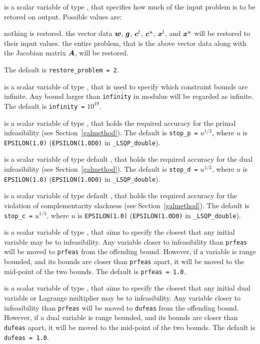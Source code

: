 \documentclass{galahad}
\newcommand{\packagename}{LSQP}
\newcommand{\fullpackagename}{\libraryname\_\-\packagename}
\begin{document}
\begin{description}
 is a scalar variable of type \integer, that 
specifies how much of the input problem is to be retored on output. 
Possible values are:
\begin{description}
 nothing is restored. 
 the vector data ${\bm{w}}$, ${\bm{g}}$, 
   ${\bm{c}}^{l}$, ${\bm{c}}^{u}$, ${\bm{x}}^{l}$, and ${\bm{x}}^{u}$ 
   will be restored to their input values.
 the entire problem, that is the above vector data along with 
the Jacobian matrix ${\bm{A}}$, will be restored.
\end{description}
The default is {\tt restore\_problem = 2}.

 is a scalar variable of type \realdp, that is used to
specify which constraint bounds are infinite.
Any bound larger than {\tt infinity} in modulus will be regarded as infinite.
The default is {\tt infinity =} $10^{19}$.

 is a scalar variable of type \realdp, that holds the
required accuracy for the primal infeasibility (see Section~\ref{galmethod}).
The default is {\tt stop\_p =} $u^{1/3}$,
where $u$ is {\tt EPSILON(1.0)} ({\tt EPSILON(1.0D0)} in 
{\tt \fullpackagename\_double}).

 is a scalar variable of type default 
\realdp, that holds the
required accuracy for the dual infeasibility (see Section~\ref{galmethod}).
The default is {\tt stop\_d =} $u^{1/3}$,
where $u$ is {\tt EPSILON(1.0)} ({\tt EPSILON(1.0D0)} in 
{\tt \fullpackagename\_double}).

 is a scalar variable of type default 
\realdp, that holds the
required accuracy for the violation of complementarity slackness 
(see Section~\ref{galmethod}).
The default is {\tt stop\_c =} $u^{1/3}$,
where $u$ is {\tt EPSILON(1.0)} ({\tt EPSILON(1.0D0)} in 
{\tt \fullpackagename\_double}).

 is a scalar variable of type \realdp, that aims to specify
the closest that any initial variable may be to infeasibility. Any variable
closer to infeasibility than {\tt prfeas} will be moved to {\tt prfeas} from 
the offending bound. However, if a variable is range bounded, and its bounds 
are closer than {\tt prfeas} apart, it will be moved to the mid-point of the 
two bounds.
The default is {\tt prfeas = 1.0}.

 is a scalar variable of type \realdp, that aims to specify
the closest that any initial dual variable or Lagrange multiplier may be to 
infeasibility. Any variable closer to infeasibility than {\tt prfeas} will be
moved to {\tt dufeas} from the offending bound. However, if a dual variable
is range bounded, and its bounds are closer than {\tt dufeas} apart, it will
be moved to the mid-point of the two bounds.
The default is {\tt dufeas = 1.0}.


\end{description}
\end{document}
